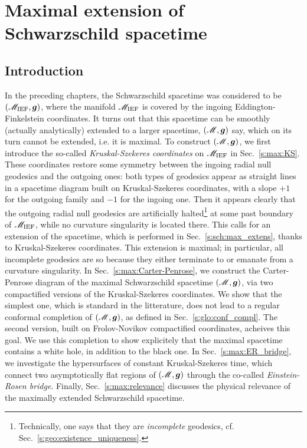 \chapter{Maximal extension of Schwarzschild spacetime}
\label{s:max}

\minitoc

\section{Introduction}

In the preceding chapters, the Schwarzschild spacetime was considered
to be $(\mathscr{M}_{\rm IEF}, \bm{g})$, where the manifold $\mathscr{M}_{\rm IEF}$
is covered by the ingoing
Eddington-Finkelstein coordinates. It turns out that this spacetime
can be smoothly (actually analytically) extended to a larger spacetime,
$(\mathscr{M},\bm{g})$ say, which on its turn cannot be extended, i.e. it is maximal.
To construct $(\mathscr{M},\bm{g})$, we first introduce the so-called \emph{Kruskal-Szekeres
coordinates} on $\mathscr{M}_{\rm IEF}$ in Sec.~\ref{s:max:KS}.
These coordinates restore some symmetry between the ingoing
radial null geodesics and the outgoing ones: both types of geodesics appear
as straight lines in a spacetime diagram built on Kruskal-Szekeres coordinates,
with a slope $+1$ for the outgoing family and $-1$ for the ingoing one.
Then it appears clearly that the outgoing radial null geodesics are artificially
halted\footnote{Technically, one says that they are \emph{incomplete} geodesics, cf. Sec.~\ref{s:geo:existence_uniqueness}.}
at some past boundary of $\mathscr{M}_{\rm IEF}$, while no curvature singularity is located there.
This calls for an extension of the spacetime, which is performed
in Sec.~\ref{s:sch:max_extens}, thanks to Kruskal-Szekeres coordinates.
This extension is maximal; in particular, all
incomplete geodesics are so because they either terminate to or emanate from a
curvature singularity. In Sec.~\ref{s:max:Carter-Penrose}, we
construct the Carter-Penrose diagram of the maximal Schwarzschild spacetime $(\mathscr{M},\bm{g})$,
via two compactified versions of the Kruskal-Szekeres coordinates.
We show that the simplest one, which is standard in the litterature,
does not lead to a regular conformal completion
of $(\mathscr{M},\bm{g})$, as defined in Sec.~\ref{s:glo:conf_compl}.
The second version, built on Frolov-Novikov compactified coordinates,
acheives this goal. We use this completion to show explicitely that the maximal
spacetime contains a white hole, in addition to the black one.
In Sec.~\ref{s:max:ER_bridge}, we investigate the hypersurfaces of
constant Kruskal-Szekeres time, which connect two asymptotically flat regions
of $(\mathscr{M},\bm{g})$ through the co-called \emph{Einstein-Rosen bridge}.
Finally, Sec.~\ref{s:max:relevance} discusses the physical relevance
of the maximally extended Schwarzschild spacetime.

